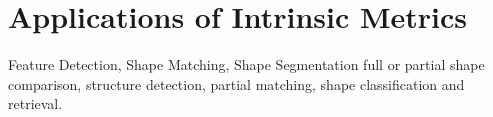 \chapter{Applications of Intrinsic Metrics}
\label{chapter:shapeMatching}

Feature Detection, Shape Matching, Shape Segmentation
full or partial shape comparison, structure detection, partial matching, shape classification and retrieval.
